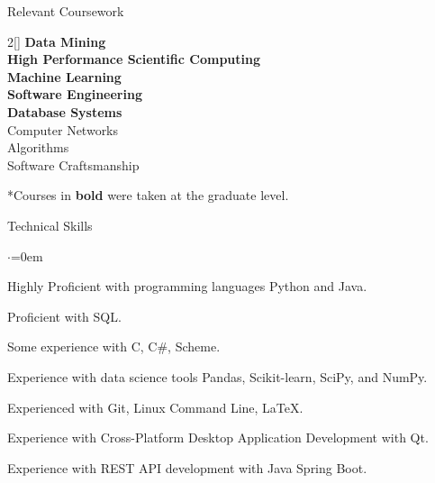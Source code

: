 \documentclass{resume} %
\begin{document}

\begin{rSection}{Relevant Coursework}
\begin{multicols}{2}[]
\textbf{Data Mining} \\
\textbf{High Performance Scientific Computing} \\
\textbf{Machine Learning} \\
\textbf{Software Engineering} \\ 
\textbf{Database Systems} \\
Computer Networks \\
Algorithms \\
Software Craftsmanship
\end{multicols}
\vspace{-1.0em}
*Courses in \textbf{bold} were taken at the graduate level.
\end{rSection}



\begin{rSection}{Technical Skills}
\begin{list}{$\cdot$}{\leftmargin=0em}
\item Highly Proficient with programming languages Python and Java.
\vspace{-0.5em}
\item Proficient with SQL.
\vspace{-0.5em}
\item Some experience with C, C\#, Scheme.
\vspace{-0.5em}
\item Experience with data science tools Pandas, Scikit-learn, SciPy, and NumPy.
\vspace{-0.5em}
\item Experienced with Git, Linux Command Line, LaTeX.
\vspace{-0.5em}
\item Experience with Cross-Platform Desktop Application Development with Qt.
\vspace{-0.5em}
\item Experience with REST API development with Java Spring Boot.
\vspace{-0.5em}
\end{list}
\end{rSection}
\end{document}

